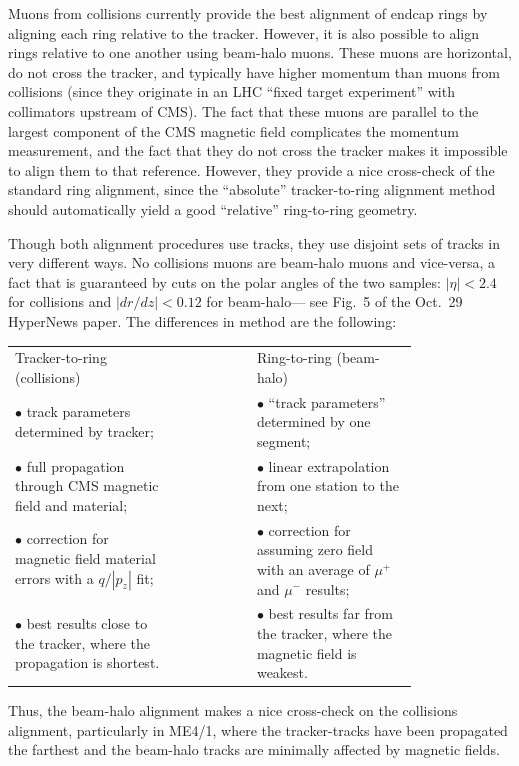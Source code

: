 \documentclass[12pt]{article}
\begin{document}
Muons from collisions currently provide the best alignment of endcap
rings by aligning each ring relative to the tracker.  However, it is
also possible to align rings relative to one another using beam-halo
muons.  These muons are horizontal, do not cross the tracker, and
typically have higher momentum than muons from collisions (since they
originate in an LHC ``fixed target experiment'' with collimators
upstream of CMS).  The fact that these muons are parallel to the
largest component of the CMS magnetic field complicates the momentum
measurement, and the fact that they do not cross the tracker makes it
impossible to align them to that reference.  However, they provide a
nice cross-check of the standard ring alignment, since the
``absolute'' tracker-to-ring alignment method should automatically
yield a good ``relative'' ring-to-ring geometry.

Though both alignment procedures use tracks, they use disjoint sets of
tracks in very different ways.  No collisions muons are beam-halo
muons and vice-versa, a fact that is guaranteed by cuts on the polar
angles of the two samples: $|\eta| < 2.4$ for collisions and $|dr/dz|
< 0.12$ for beam-halo--- see Fig.~5 of the Oct.~29 HyperNews paper.
The differences in method are the following:
\begin{center}
\renewcommand{\arraystretch}{1.5}
\begin{tabular}{p{0.4\linewidth} c p{0.4\linewidth}}
Tracker-to-ring (collisions) & & Ring-to-ring (beam-halo) \\
$\bullet$ track parameters determined by tracker; & & $\bullet$ ``track parameters'' determined by one segment; \\
$\bullet$ full propagation through CMS magnetic field and material; & & $\bullet$ linear extrapolation from one station to the next; \\
$\bullet$ correction for magnetic field material errors with a $q/|p_z|$ fit; & & $\bullet$ correction for assuming zero field with an average of $\mu^+$ and $\mu^-$ results; \\
$\bullet$ best results close to the tracker, where the propagation is shortest. & & $\bullet$ best results far from the tracker, where the magnetic field is weakest.
\end{tabular}
\end{center}
Thus, the beam-halo alignment makes a nice cross-check on the
collisions alignment, particularly in ME4/1, where the tracker-tracks
have been propagated the farthest and the beam-halo tracks are
minimally affected by magnetic fields.
\end{document}
